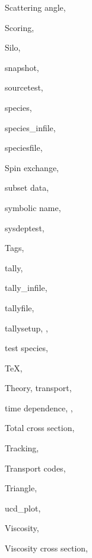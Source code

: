 \documentclass[12pt]{report}
\begin{document}
\begin{theindex}
  \indexspace

  \item Scattering angle, 
  \item Scoring, 
  \item Silo, 
  \item snapshot, 
  \item sourcetest, 
  \item species, 
  \item species\_infile, 
  \item speciesfile, 
  \item Spin exchange, 
  \item subset data, 
  \item symbolic name, 
  \item sysdeptest, 

  \indexspace

  \item Tags, 
  \item tally, 
  \item tally\_infile, 
  \item tallyfile, 
  \item tallysetup, , 
  \item test species, 
  \item TeX, 
  \item Theory, transport, 
  \item time dependence, , 
  \item Total cross section, 
  \item Tracking, 
  \item Transport codes, 
  \item Triangle, 

  \indexspace

  \item ucd\_plot, 

  \indexspace

  \item Viscosity, 
  \item Viscosity cross section, 

\end{theindex}


\tableofcontents
\end{document}
